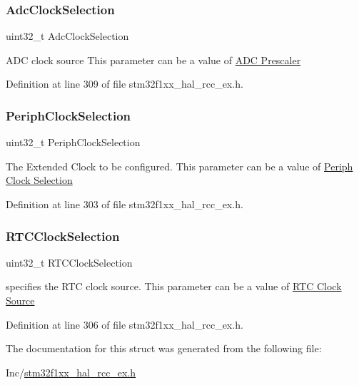 \subsubsection{\texorpdfstring{Adc\+Clock\+Selection}{AdcClockSelection}}
{\footnotesize\ttfamily uint32\+\_\+t Adc\+Clock\+Selection}

A\+DC clock source This parameter can be a value of \hyperlink{group___r_c_c_ex___a_d_c___prescaler}{A\+DC Prescaler} 

Definition at line 309 of file stm32f1xx\+\_\+hal\+\_\+rcc\+\_\+ex.\+h.

\mbox{\label{struct_r_c_c___periph_c_l_k_init_type_def_a82dae3f6a5ae6c184bd1b95a88d41fc2}} 
\subsubsection{\texorpdfstring{Periph\+Clock\+Selection}{PeriphClockSelection}}
{\footnotesize\ttfamily uint32\+\_\+t Periph\+Clock\+Selection}

The Extended Clock to be configured. This parameter can be a value of \hyperlink{group___r_c_c_ex___periph___clock___selection}{Periph Clock Selection} 

Definition at line 303 of file stm32f1xx\+\_\+hal\+\_\+rcc\+\_\+ex.\+h.

\mbox{\label{struct_r_c_c___periph_c_l_k_init_type_def_a831cc6023077b77683871743290aa720}} 
\subsubsection{\texorpdfstring{R\+T\+C\+Clock\+Selection}{RTCClockSelection}}
{\footnotesize\ttfamily uint32\+\_\+t R\+T\+C\+Clock\+Selection}

specifies the R\+TC clock source. This parameter can be a value of \hyperlink{group___r_c_c___r_t_c___clock___source}{R\+TC Clock Source} 

Definition at line 306 of file stm32f1xx\+\_\+hal\+\_\+rcc\+\_\+ex.\+h.



The documentation for this struct was generated from the following file\+:\begin{DoxyCompactItemize}
\item 
Inc/\hyperlink{stm32f1xx__hal__rcc__ex_8h}{stm32f1xx\+\_\+hal\+\_\+rcc\+\_\+ex.\+h}\end{DoxyCompactItemize}
